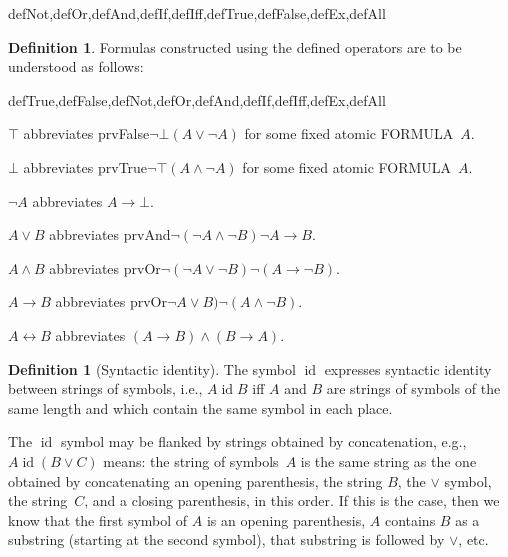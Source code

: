 \documentclass[10pt,a4paper]{article}
\newcommand*{\olup}[1]{\MakeUppercase{#1}}
\theoremstyle{plain}
\theoremstyle{definition}
\newtheorem{defn}[thm]{Definition}
\theoremstyle{remark}
\providecommand{\lif}{\mathbin{\rightarrow}}
\providecommand{\ltrue}{\top}
\providecommand{\lfalse}{\bot}
\providecommand{\iftag}[1]{#1}
\providecommand{\tagitem}[1]{\item[#1]}
\providecommand{\liff}{\mathbin{\leftrightarrow}}
\providecommand{\ident}{\operatorname{id}}
\providecommand{\iftag}{}
\begin{document}
\begin{tagblock}{defNot,defOr,defAnd,defIf,defIff,defTrue,defFalse,defEx,defAll}
\begin{defn}
Formulas constructed using the defined operators are to be understood
as follows:

\begin{tagenumerate}{defTrue,defFalse,defNot,defOr,defAnd,defIf,defIff,defEx,defAll}

\tagitem{defTrue}{$\ltrue$ abbreviates
  \iftag{prvFalse}{$\lnot\lfalse$}{$(A \lor \lnot A)$ for some
    fixed atomic \olup{formula}~$A$}.}{}

\tagitem{defFalse}{$\lfalse$ abbreviates
  \iftag{prvTrue}{$\lnot\ltrue$}{$(A \land \lnot A)$ for some
    fixed atomic \olup{formula}~$A$}.}{}

\tagitem{defNot}{$\lnot A$ abbreviates $A \lif \lfalse$.}{}

\tagitem{defOr}{$A \lor B$ abbreviates
  \iftag{prvAnd}{$\lnot(\lnot A \land \lnot B)$}{$\lnot A \lif
    B$}.}{}

\tagitem{defAnd}{$A \land B$ abbreviates
  \iftag{prvOr}{$\lnot(\lnot A \lor \lnot B)$}{$\lnot (A \lif
    \lnot B)$}.}{}

\tagitem{defIf}{$A \lif B$ abbreviates
  \iftag{prvOr}{$\lnot A \lor B)$}{$\lnot (A \land \lnot B)$}.}{}

\tagitem{defIff}{$A \liff B$ abbreviates $(A \lif B) \land (B
  \lif A)$.}{}
\end{tagenumerate}
\end{defn}
\end{tagblock}

\begin{defn}[Syntactic identity]
The symbol $\ident$ expresses syntactic identity between strings of
symbols, i.e., $A \ident B$ iff $A$ and $B$ are strings of symbols
of the same length and which contain the same symbol in each place.
\end{defn}

The $\ident$ symbol may be flanked by strings obtained by
concatenation, e.g., $A \ident (B \lor C)$ means: the string of
symbols~$A$ is the same string as the one obtained by concatenating
an opening parenthesis, the string $B$, the $\lor$ symbol, the
string~$C$, and a closing parenthesis, in this order. If this is the
case, then we know that the first symbol of $A$ is an opening
parenthesis, $A$ contains $B$ as a substring (starting at the second
symbol), that substring is followed by $\lor$, etc.


\end{document}
